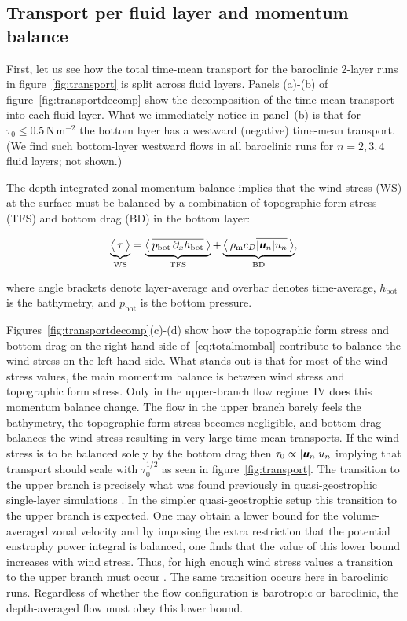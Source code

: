 \documentclass{agujournal2019}
\newcommand{\mathbfit}[1]{\textbf{\textit{\textsf{#1}}}}
\newcommand{\bu}		{\mathbfit u}
\newcommand{\Pa}		{\mathrm{N}\,\mathrm{m}^{-2}}
\newcommand{\rhom} {\rho_{\mathrm{m}}}
\newcommand{\ws} {\mathrm{WS}}
\newcommand{\tfs} {\mathrm{TFS}}
\newcommand{\bd} {\mathrm{BD}}
\newcommand{\hb} {h_{\mathrm{bot}}}
\newcommand{\pb} {p_{\mathrm{bot}}}
\begin{document}
\subsection{Transport per fluid layer and momentum balance}\label{sec:resultdetails1}

First, let us see how the total time-mean transport for the baroclinic 2-layer runs  in figure~\ref{fig:transport} is split across fluid layers. Panels (a)-(b) of figure~\ref{fig:transportdecomp} show the decomposition of the time-mean transport into each fluid layer. What we immediately notice in panel~(b) is that for $\tau_0\le0.5\,\Pa$ the bottom layer has a westward (negative) time-mean transport. (We find such bottom-layer westward flows in all baroclinic runs for $n=2, 3, 4$ fluid layers; not shown.)



The depth integrated zonal momentum balance implies that the wind stress (WS) at the surface must be balanced by a combination of topographic form stress (TFS) and bottom drag (BD) in the bottom layer:
\begin{linenomath*}
\begin{equation}
\underbrace{\big\langle\,\tau\,\big\rangle}_{\ws} = \underbrace{\big\langle\, \overline{\pb\,\partial_x{\hb}}\,\big\rangle}_{\tfs} + \underbrace{\big\langle\, \rhom c_D\overline{|\bu_n|u_n}\,\big\rangle }_{\bd}, \label{eq:totalmombal}
\end{equation}
\end{linenomath*}
where angle brackets denote layer-average and overbar denotes time-average, $\hb$ is the bathymetry, and $\pb$ is the bottom pressure.

Figures~\ref{fig:transportdecomp}(c)-(d) show how the topographic form stress and bottom drag on the right-hand-side of~\eqref{eq:totalmombal} contribute to balance the wind stress on the left-hand-side. What stands out is that for most of the wind stress values, the main momentum balance is between wind stress and topographic form stress. Only in the upper-branch flow regime~IV does this momentum balance change. The flow in the upper branch barely feels the bathymetry, the topographic form stress becomes negligible, and bottom drag balances the wind stress resulting in very large time-mean transports. If the wind stress is to be balanced solely by the bottom drag then $\tau_0 \propto |\bu_n|u_n$ implying that transport should scale with $\tau_0^{1/2}$ as seen in figure~\ref{fig:transport}. The transition to the upper branch is precisely what was found previously in quasi-geostrophic single-layer simulations \cite{Constantinou-Young-2017,Constantinou-2018}. In the simpler quasi-geostrophic setup this transition to the upper branch is expected. One may obtain a lower bound for the volume-averaged zonal velocity and by imposing the extra restriction that the potential enstrophy power integral is balanced, one finds that the value of this lower bound increases with wind stress. Thus, for high enough wind stress values a transition to the upper branch must occur \cite{Constantinou-Young-2017}. The same transition occurs here in baroclinic runs. Regardless of whether the flow configuration is barotropic or baroclinic, the depth-averaged flow must obey this lower bound. 
\end{document}
